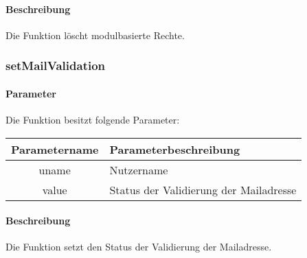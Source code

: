 \paragraph{Beschreibung} Die Funktion löscht modulbasierte Rechte.
\subsubsection{setMailValidation}
\paragraph{Parameter} Die Funktion besitzt folgende Parameter:
\begin{table}[H]
	\begin{tabular}{|c|p{11cm}|}
		\hline
		\textbf{Parametername} & \textbf{Parameterbeschreibung} \\ \hline
		uname & Nutzername \\ \hline
		value & Status der Validierung der Mailadresse \\ \hline
	\end{tabular}
\end{table}
\paragraph{Beschreibung} Die Funktion setzt den Status der Validierung der Mailadresse.